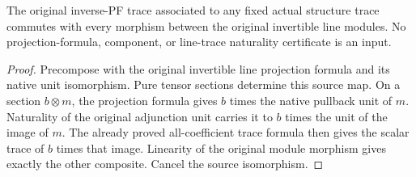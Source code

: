 \begin{lemma}
\label{lem:kn-original-line-trace-naturality}
\leanok
The original inverse-PF trace associated to any fixed actual structure trace
commutes with every morphism between the original invertible line modules.
No projection-formula, component, or line-trace naturality certificate is an input.
\end{lemma}
\begin{proof}
Precompose with the original invertible line projection formula and its native
unit isomorphism. Pure tensor sections determine this source map. On a section
$b\otimes m$, the projection formula gives $b$ times the native pullback unit
of $m$. Naturality of the original adjunction unit carries it to $b$ times the
unit of the image of $m$. The already proved all-coefficient trace formula then
gives the scalar trace of $b$ times that image. Linearity of the original module
morphism gives exactly the other composite. Cancel the source isomorphism.
\end{proof}

